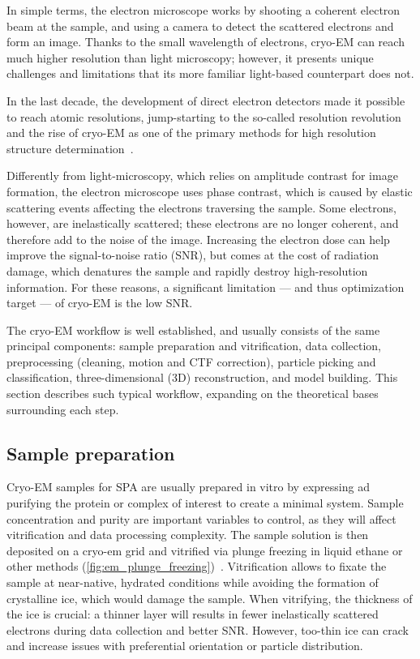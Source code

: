 In simple terms, the electron microscope works by shooting a coherent electron beam at the sample, and using a camera to detect the scattered electrons and form an image.
Thanks to the small wavelength of electrons, cryo-EM can reach much higher resolution than light microscopy; however, it presents unique challenges and limitations that its more familiar light-based counterpart does not.

In the last decade, the development of direct electron detectors made it possible to reach atomic resolutions, jump-starting to the so-called resolution revolution and the rise of cryo-EM as one of the primary methods for high resolution structure determination~\cite{faruqiCCDDetectorsHighresolution2000}.

Differently from light-microscopy, which relies on amplitude contrast for image formation, the electron microscope uses phase contrast, which is caused by elastic scattering events affecting the electrons traversing the sample.
Some electrons, however, are inelastically scattered; these electrons are no longer coherent, and therefore add to the noise of the image.
Increasing the electron dose can help improve the signal-to-noise ratio (SNR), but comes at the cost of radiation damage, which denatures the sample and rapidly destroy high-resolution information.
For these reasons, a significant limitation --- and thus optimization target --- of cryo-EM is the low SNR.

The cryo-EM workflow is well established, and usually consists of the same principal components: sample preparation and vitrification, data collection, preprocessing (cleaning, motion and CTF correction), particle picking and classification, three-dimensional (3D) reconstruction, and model building.
This section describes such typical workflow, expanding on the theoretical bases surrounding each step.

\subsection{Sample preparation}
Cryo-EM samples for SPA are usually prepared in vitro by expressing ad purifying the protein or complex of interest to create a minimal system.
Sample concentration and purity are important variables to control, as they will affect vitrification and data processing complexity.
The sample solution is then deposited on a cryo-em grid and vitrified via plunge freezing in liquid ethane or other methods (\autoref{fig:em_plunge_freezing})~\cite{dubochetCryoelectronMicroscopyVitrified1988}.
Vitrification allows to fixate the sample at near-native, hydrated conditions while avoiding the formation of crystalline ice, which would damage the sample.
When vitrifying, the thickness of the ice is crucial: a thinner layer will results in fewer inelastically scattered electrons during data collection and better SNR.
However, too-thin ice can crack and increase issues with preferential orientation or particle distribution.


